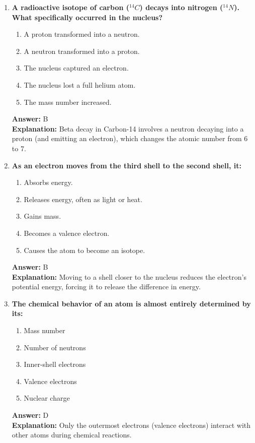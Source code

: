 \documentclass[11pt, a4paper]{article}
\begin{document}
\begin{enumerate}
\item \textbf{A radioactive isotope of carbon ($^{14}C$) decays into nitrogen ($^{14}N$). What specifically occurred in the nucleus?}
\begin{enumerate}[label=\Alph*.]
    \item A proton transformed into a neutron.
    \item A neutron transformed into a proton.
    \item The nucleus captured an electron.
    \item The nucleus lost a full helium atom.
    \item The mass number increased.
\end{enumerate}
\textbf{Answer:} B \\
\textbf{Explanation:} Beta decay in Carbon-14 involves a neutron decaying into a proton (and emitting an electron), which changes the atomic number from 6 to 7.

\item \textbf{As an electron moves from the third shell to the second shell, it:}
\begin{enumerate}[label=\Alph*.]
    \item Absorbs energy.
    \item Releases energy, often as light or heat.
    \item Gains mass.
    \item Becomes a valence electron.
    \item Causes the atom to become an isotope.
\end{enumerate}
\textbf{Answer:} B \\
\textbf{Explanation:} Moving to a shell closer to the nucleus reduces the electron's potential energy, forcing it to release the difference in energy.

\item \textbf{The chemical behavior of an atom is almost entirely determined by its:}
\begin{enumerate}[label=\Alph*.]
    \item Mass number
    \item Number of neutrons
    \item Inner-shell electrons
    \item Valence electrons
    \item Nuclear charge
\end{enumerate}
\textbf{Answer:} D \\
\textbf{Explanation:} Only the outermost electrons (valence electrons) interact with other atoms during chemical reactions.


\end{enumerate}
\end{document}

